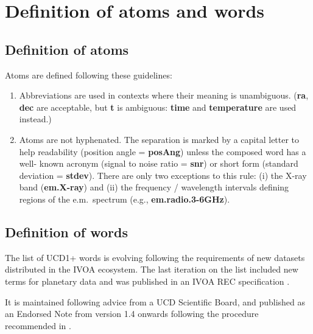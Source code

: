 \documentclass[11pt,a4paper]{ivoa}
\begin{document}
\appendix

\section{Definition of atoms and words}

\subsection{Definition of atoms}
Atoms are defined following these guidelines:
\begin{enumerate}
\item Abbreviations are used in contexts where their meaning is unambiguous. ({\bf ra}, {\bf dec} are 
acceptable, but {\bf t} is ambiguous: {\bf time} and {\bf temperature} are used instead.)
\item Atoms are not hyphenated. The separation is marked by a capital letter to help readability 
(position angle = {\bf posAng}) unless the composed word has a well- known acronym (signal to noise ratio = 
{\bf snr}) or short form (standard deviation = {\bf stdev}). There are only two exceptions to this rule: 
(i) the X-ray band ({\bf em.X-ray}) and (ii) the frequency / wavelength intervals defining regions of the 
e.m.~spectrum (e.g., {\bf em.radio.3-6GHz}).
\end{enumerate}

\subsection{Definition of words}
\label{sec:words}

The list of UCD1+ words is evolving following the requirements of new datasets distributed in the 
IVOA ecosystem. The last iteration on the list included new terms for planetary data and was 
published in an IVOA REC specification \citep{2018ivoa.spec.0527P}.

It is maintained following advice from a UCD Scientific Board, and published as an Endorsed Note 
from version 1.4 onwards following the procedure recommended in \citep{2019ivoa.spec.1007G}. 
\end{document}
